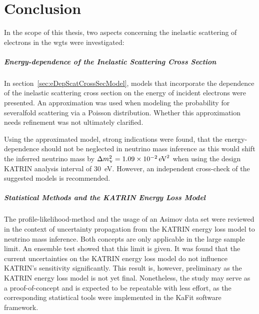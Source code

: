 \chapter{Conclusion}
\label{sec:conclusion}
In the scope of this thesis, two aspects concerning the inelastic scattering of electrons in the \gls{wgts} were investigated:

\paragraph{Energy-dependence of the Inelastic Scattering Cross Section}
In section~\ref{sec:eDepScatCrossSecModel}, models that incorporate the dependence of the inelastic scattering cross section on the energy of incident electrons were presented. An approximation was used when modeling the probability for severalfold scattering via a Poisson distribution. Whether this approximation needs refinement was not ultimately clarified.

Using the approximated model, strong indications were found, that the energy-dependence should not be neglected in neutrino mass inference as this would shift the inferred neutrino mass by 	$\Delta m_\upnu^2 = \SI{1.09e-2}{eV^2}$ when using the design KATRIN analysis interval of \SI{30}{eV}. However, an independent cross-check of the suggested models is recommended.

\paragraph{Statistical Methods and the KATRIN Energy Loss Model}
The profile-likelihood-method and the usage of an Asimov data set were reviewed in the context of uncertainty propagation from the KATRIN energy loss model to neutrino mass inference. Both concepts are only applicable in the large sample limit. An ensemble test showed that this limit is given. It was found that the current uncertainties on the KATRIN energy loss model do not influence KATRIN's sensitivity significantly. This result is, however, preliminary as the KATRIN energy loss model is not yet final. Nonetheless, the study may serve as a proof-of-concept and is expected to be repeatable with less effort, as the corresponding statistical tools were implemented in the KaFit software framework. 
